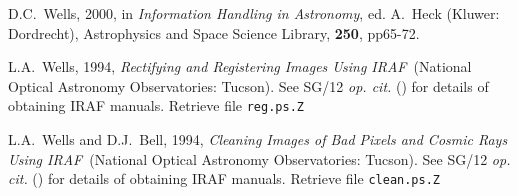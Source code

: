 \documentclass[twoside,11pt]{article}
\newcommand{\xref}[3]{#1}
\begin{document}
\begin{thebibliography}{99}
   D.C.~Wells, 2000, in {\it Information Handling in
   Astronomy}, ed. A.~Heck (Kluwer: Dordrecht), Astrophysics and Space
   Science Library, {\bf 250}, pp65-72.

   L.A.~Wells, 1994, {\it Rectifying and Registering
   Images Using IRAF}\, (National Optical Astronomy Observatories: Tucson).
   See \xref{SG/12}{sg12}{} {\it op. cit.}\/ (\cite{SG12}) for details of
   obtaining IRAF manuals.  Retrieve file {\tt reg.ps.Z}

   L.A.~Wells and D.J.~Bell, 1994, {\it Cleaning
   Images of Bad Pixels and Cosmic Rays Using IRAF}\, (National Optical
   Astronomy Observatories: Tucson).  See \xref{SG/12}{sg12}{} {\it op.
   cit.}\/ (\cite{SG12}) for details of obtaining IRAF manuals.  Retrieve
   file {\tt clean.ps.Z}

\end{thebibliography}


\typeout{  }
\typeout{*****************************************************}
\typeout{  }
\typeout{  }
\typeout{*****************************************************}
\typeout{  }
\end{document}
